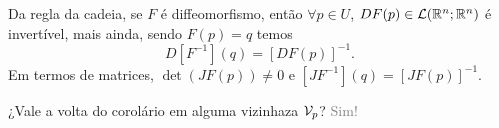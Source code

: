 \begin{corollary}
    Da regla da cadeia, se \(F\) é diffeomorfismo, então \(\forall p \in U\), \(DF(p)\in \mathcal{L}(\mathbb{R}^n; \mathbb{R}^n)\) é invertível, mais ainda, sendo \(F(p)=q\) temos  
    \[D[F^{-1}](q) = [DF(p)]^{-1}.\]
    Em termos de matrices, \(\det(JF(p))\neq 0\) e \([JF^{-1}](q) = [JF(p)]^{-1}\).
\end{corollary}

\begin{note}
    ¿Vale a volta do corolário em alguma vizinhaza $\mathcal{V}_p$? \textcolor{gray}{ Sim! }
\end{note}

